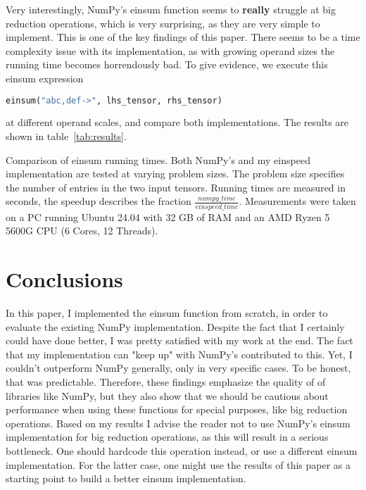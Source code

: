 \documentclass[sigconf]{acmart}
\begin{document}
Very interestingly, NumPy's einsum function seems to \textbf{really} struggle at big reduction operations, which is very surprising, as they are very simple to implement. This is one of the key findings of this paper. There seems to be a time complexity issue with its implementation, as with growing operand sizes the running time becomes horrendously bad. To give evidence, we execute this einsum expression
\begin{lstlisting}[language=Python]
einsum("abc,def->", lhs_tensor, rhs_tensor)
\end{lstlisting}
at different operand scales, and compare both implementations. The results are shown in table~\ref{tab:results}.

\begin{table}[htbp]
  \caption{Comparison of einsum running times. Both NumPy's and my einspeed implementation are tested at varying problem sizes. The problem size specifies the number of entries in the two input tensors. Running times are measured in seconds, the speedup describes the fraction $\frac{numpy\_time}{einspeed\_time}$. 
  Measurements were taken on a PC running Ubuntu 24.04 with 32 GB of RAM and an AMD Ryzen 5 5600G CPU (6 Cores, 12 Threads).}
  \label{tab:results}
\end{table}


\section{Conclusions}
\label{sec:conclusions}
In this paper, I implemented the einsum function from scratch, in order to evaluate the existing NumPy implementation. Despite the fact that I certainly could have done better, I was pretty satisfied with my work at the end. The fact that my implementation can "keep up" with NumPy's contributed to this. Yet, I couldn't outperform NumPy generally, only in very specific cases. To be honest, that was predictable. Therefore, these findings emphasize the quality of of libraries like NumPy, but they also show that we should be cautious about performance when using these functions for special purposes, like big reduction operations. Based on my results I advise the reader not to use NumPy's einsum implementation for big reduction operations, as this will result in a serious bottleneck. One should hardcode this operation instead, or use a different einsum implementation. For the latter case, one might use the results of this paper as a starting point to build a better einsum implementation.




\end{document}
